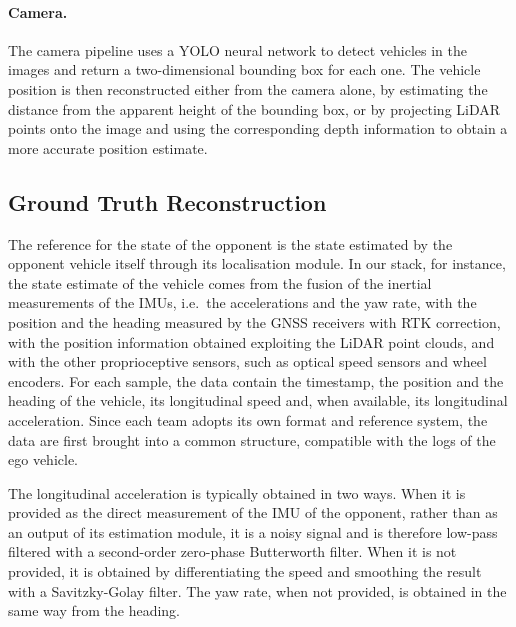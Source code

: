 \paragraph{Camera.} The camera pipeline uses a YOLO neural network to detect vehicles in the
images and return a two-dimensional bounding box for each one. The vehicle position is then
reconstructed either from the camera alone, by estimating the distance from the apparent
height of the bounding box, or by projecting LiDAR points onto the image and using the
corresponding depth information to obtain a more accurate position estimate.

\subsection{Ground Truth Reconstruction}
\label{sec:gt}

The reference for the state of the opponent is the state estimated by the opponent
vehicle itself through its localisation module. In our stack, for instance, the state
estimate of the vehicle comes from the fusion of the inertial measurements of the IMUs,
i.e.\ the accelerations and the yaw rate, with the position and the heading measured by the
GNSS receivers with RTK correction, with the position information obtained exploiting the
LiDAR point clouds, and with the other proprioceptive sensors, such as optical speed sensors
and wheel encoders. For each sample, the data contain the timestamp, the position and the heading of
the vehicle, its longitudinal speed and, when available, its longitudinal acceleration.
Since each team adopts its own format and reference system, the data are first brought
into a common structure, compatible with the logs of the ego vehicle.

The longitudinal acceleration is typically obtained in two ways. When it is provided as the
direct measurement of the IMU of the opponent, rather than as an output of its estimation
module, it is a noisy signal and is therefore low-pass filtered with a second-order
zero-phase Butterworth filter. When it is not provided, it is obtained by differentiating the
speed and smoothing the result with a Savitzky-Golay filter. The yaw rate, when not provided, is obtained in the same way from the heading.

